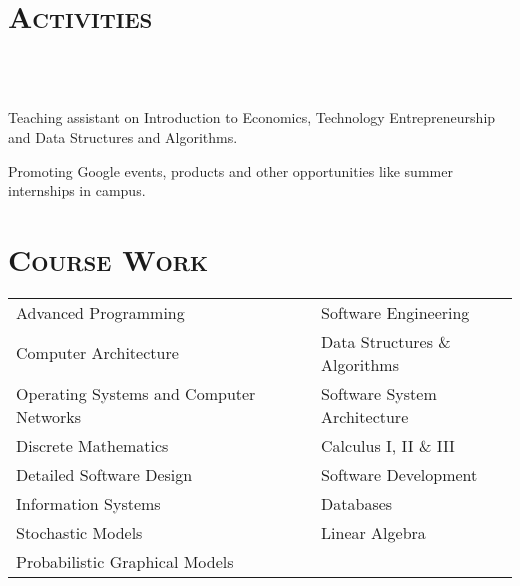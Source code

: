 \begin{resume}






\section{\textsc{Activities}}

\begin{formatb}
  \\
  \body\\
\end{formatb}

\begin{position}
Teaching assistant on Introduction to Economics, Technology Entrepreneurship and Data Structures and Algorithms.
\end{position}

\begin{position}
Promoting Google events, products and other opportunities like summer internships in campus.
\end{position}



\section{\textsc{Course Work}}
  \begin{tabular}{lll}
  Advanced Programming   & \ \ & Software Engineering   \\ 
  Computer Architecture      & \ \ & Data Structures \& Algorithms   \\
  Operating Systems and Computer Networks   & \ \ & Software System Architecture   \\
  Discrete Mathematics    & \ \ & Calculus I, II \& III   \\
  Detailed Software Design     & \ \ & Software Development  \\
  Information Systems     & \ \ & Databases   \\
  Stochastic Models      & \ \ & Linear Algebra  \\
  Probabilistic Graphical Models      & \ \ &  \\
  \end{tabular}


\end{resume}

